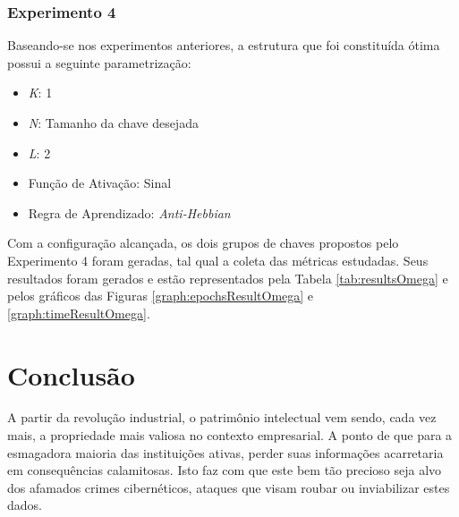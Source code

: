 \documentclass[12pt]{article}
\begin{document}
            \subsubsection{Experimento 4}
            \label{subsubsec:experimentoOmega}
            
                Baseando-se nos experimentos anteriores, a estrutura que foi constituída ótima possui a seguinte parametrização:
                
                \begin{itemize}
                    \item \textit{K}: 1
                    \item \textit{N}: Tamanho da chave desejada
                    \item \textit{L}: 2
                    \item Função de Ativação: Sinal
                    \item Regra de Aprendizado: \textit{Anti-Hebbian}
                \end{itemize}
                
                
                Com a configuração alcançada, os dois grupos de chaves propostos pelo Experimento 4 foram geradas, tal qual a coleta das métricas estudadas. Seus resultados foram gerados e estão representados pela Tabela \ref{tab:resultsOmega} e pelos gráficos das Figuras \ref{graph:epochsResultOmega} e \ref{graph:timeResultOmega}.
                
                

                

                
  
    \section{Conclusão}
    \label{sec:conclusao}
    
        A partir da revolução industrial, o patrimônio intelectual vem sendo, cada vez mais, a propriedade mais valiosa no contexto empresarial. A ponto de que para a esmagadora maioria das instituições ativas, perder suas informações acarretaria em consequências calamitosas. Isto faz com que este bem tão precioso seja alvo dos afamados crimes cibernéticos, ataques que visam roubar ou inviabilizar estes dados.
\end{document}
